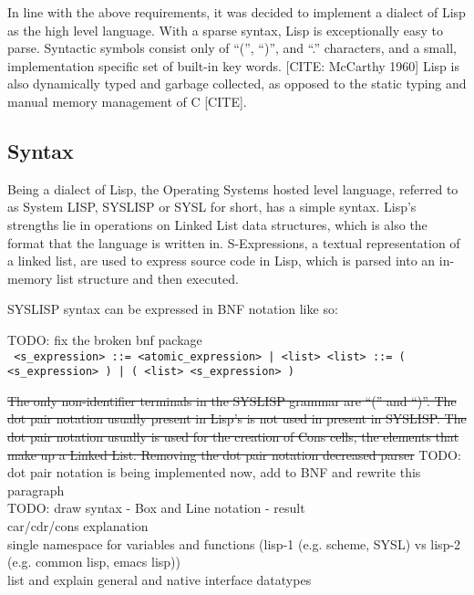 \documentclass[11pt]{report}
\begin{document}
In line with the above requirements, it was decided to implement a dialect of Lisp as the high level language. With a sparse syntax, Lisp is exceptionally easy to parse. Syntactic symbols consist only of ``('', ``)'', and ``.'' characters, and a small, implementation specific set of built-in key words. [CITE: McCarthy 1960] Lisp is also dynamically typed and garbage collected, as opposed to the static typing and manual memory management of C [CITE].

\subsection{Syntax}
Being a dialect of Lisp, the Operating Systems hosted level language, referred to as System LISP, SYSLISP or SYSL for short, has a simple syntax. Lisp's strengths lie in operations on Linked List data structures, which is also the format that the language is written in. S-Expressions, a textual representation of a linked list, are used to express source code in Lisp, which is parsed into an in-memory list structure and then executed.

SYSLISP syntax can be expressed in BNF notation like so:

TODO: fix the broken bnf package \\

\texttt{
  <s_expression> ::= <atomic_expression> | <list>
  <list> ::= ( <s_expression> ) | ( <list> <s_expression> )
}

\sout{The only non-identifier terminals in the SYSLISP grammar are ``('' and ``)''. The dot pair notation usually present in Lisp's is not used in present in SYSLISP. The dot pair notation usually is used for the creation of Cons cells, the elements that make up a Linked List. Removing the dot pair notation decreased parser} TODO: dot pair notation is being implemented now, add to BNF and rewrite this paragraph \\

TODO: draw syntax - Box and Line notation - result \\

car/cdr/cons explanation \\
single namespace for variables and functions (lisp-1 (e.g. scheme, SYSL) vs lisp-2 (e.g. common lisp, emacs lisp))\\
list and explain general and native interface datatypes \\
\end{document}
